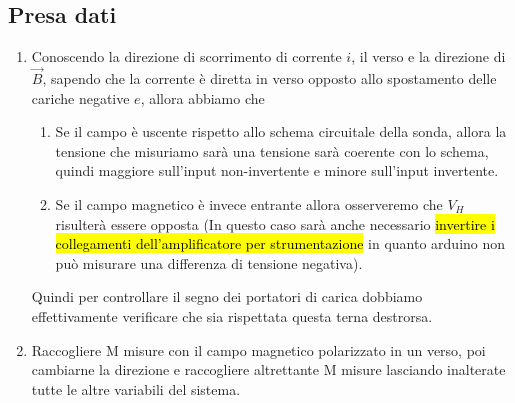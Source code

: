 \documentclass[fleqn,varvw,preprintnumbers,citeautoscript]{memo}
\begin{document}
\subsection{Presa dati}
\begin{enumerate}
    \item Conoscendo la direzione di scorrimento di corrente $i$, il verso e la direzione di $\vec{B}$, sapendo che la corrente è diretta in verso opposto allo spostamento delle cariche negative $e$, allora abbiamo che \begin{enumerate}
        \item Se il campo è uscente rispetto allo schema circuitale della sonda, allora la tensione che misuriamo sarà una tensione sarà coerente con lo schema, quindi maggiore sull'input non-invertente e minore sull'input invertente. 
        \item Se il campo magnetico è invece entrante allora osserveremo che $V_H$ risulterà essere opposta (In questo caso sarà anche necessario \hl{invertire i collegamenti dell'amplificatore per strumentazione} in quanto arduino non può misurare una differenza di tensione negativa). 
    \end{enumerate}
    Quindi per controllare il segno dei portatori di carica dobbiamo effettivamente verificare che sia rispettata questa terna destrorsa. 
    \item Raccogliere M misure con il campo magnetico polarizzato in un verso, poi cambiarne la direzione e raccogliere altrettante M misure lasciando inalterate tutte le altre variabili del sistema.
\end{enumerate}
\end{document}
